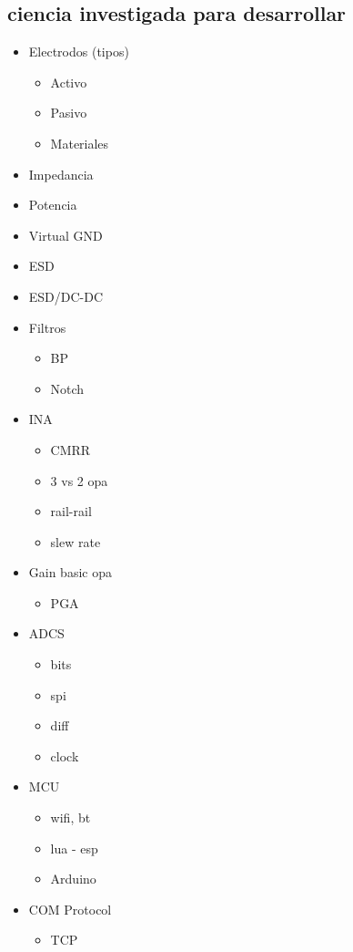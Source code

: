 \subsection{ciencia investigada para desarrollar}
\label{sec:orgc043014}
\begin{itemize}
\item Electrodos (tipos)
\begin{itemize}
\item Activo
\item Pasivo
\item Materiales
\end{itemize}
\item Impedancia
\item Potencia
\item Virtual GND
\item ESD
\item ESD/DC-DC
\item Filtros
\begin{itemize}
\item BP
\item Notch
\end{itemize}
\item INA
\begin{itemize}
\item CMRR
\item 3 vs 2 opa
\item rail-rail
\item slew rate
\end{itemize}
\item Gain basic opa
\begin{itemize}
\item PGA
\end{itemize}
\item ADCS
\begin{itemize}
\item bits
\item spi
\item diff
\item clock
\end{itemize}
\item MCU
\begin{itemize}
\item wifi, bt
\item lua - esp
\item Arduino
\end{itemize}
\item COM Protocol
\begin{itemize}
\item TCP

\end{itemize}
\end{itemize}
